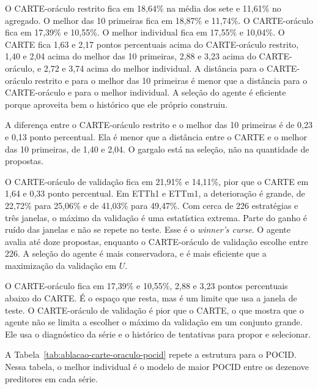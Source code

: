 O CARTE-oráculo restrito fica em 18,64\% na média dos sete e 11,61\% no agregado. O melhor das 10 primeiras fica em 18,87\% e 11,74\%. O CARTE-oráculo fica em 17,39\% e 10,55\%. O melhor individual fica em 17,55\% e 10,04\%. O CARTE fica 1,63 e 2,17 pontos percentuais acima do CARTE-oráculo restrito, 1,40 e 2,04 acima do melhor das 10 primeiras, 2,88 e 3,23 acima do CARTE-oráculo, e 2,72 e 3,74 acima do melhor individual. A distância para o CARTE-oráculo restrito e para o melhor das 10 primeiras é menor que a distância para o CARTE-oráculo e para o melhor individual. A seleção do agente é eficiente porque aproveita bem o histórico que ele próprio construiu.

A diferença entre o CARTE-oráculo restrito e o melhor das 10 primeiras é de 0,23 e 0,13 ponto percentual. Ela é menor que a distância entre o CARTE e o melhor das 10 primeiras, de 1,40 e 2,04. O gargalo está na seleção, não na quantidade de propostas.

O CARTE-oráculo de validação fica em 21,91\% e 14,11\%, pior que o CARTE em 1,64 e 0,33 ponto percentual. Em ETTh1 e ETTm1, a deterioração é grande, de 22,72\% para 25,06\% e de 41,03\% para 49,47\%. Com cerca de 226 estratégias e três janelas, o máximo da validação é uma estatística extrema. Parte do ganho é ruído das janelas e não se repete no teste. Esse é o \textit{winner's curse}. O agente avalia até doze propostas, enquanto o CARTE-oráculo de validação escolhe entre 226. A seleção do agente é mais conservadora, e é mais eficiente que a maximização da validação em $U$.

O CARTE-oráculo fica em 17,39\% e 10,55\%, 2,88 e 3,23 pontos percentuais abaixo do CARTE. É o espaço que resta, mas é um limite que usa a janela de teste. O CARTE-oráculo de validação é pior que o CARTE, o que mostra que o agente não se limita a escolher o máximo da validação em um conjunto grande. Ele usa o diagnóstico da série e o histórico de tentativas para propor e selecionar.

A Tabela~\ref{tab:ablacao-carte-oraculo-pocid} repete a estrutura para o POCID. Nessa tabela, o melhor individual é o modelo de maior POCID entre os dezenove preditores em cada série.

